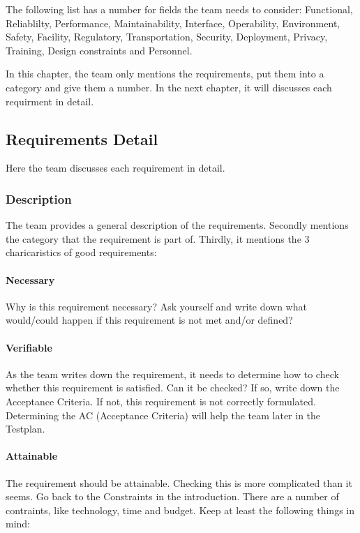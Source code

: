 \documentclass[10pt]{report}
\begin{document}
The following list has a number for fields the team needs to consider: Functional, Reliablilty, Performance, Maintainability, Interface, Operability, Environment, Safety, Facility, Regulatory, Transportation, Security, Deployment, Privacy, Training, Design constraints and Personnel.

In this chapter, the team only mentions the requirements, put them into a category and give them a number. In the next chapter, it will discusses each requirment in detail.

\subsection{Requirements Detail}

Here the team discusses each requirement in detail. 

\subsubsection{Description}

The team provides a general description of the requirements. Secondly mentions the category that the requirement is part of. Thirdly, it mentions the 3 charicaristics of good requirements:

\paragraph{Necessary}

Why is this requirement necessary? Ask yourself and write down what would/could happen if this requirement is not met and/or defined?

\paragraph{Verifiable}

As the team writes down the requirement, it needs to determine how to check whether this requirement is satisfied. Can it be checked? If so, write down the Acceptance Criteria. If not, this requirement is not correctly formulated. Determining the AC (Acceptance Criteria) will help the team later in the Testplan.

\paragraph{Attainable}

The requirement should be attainable. Checking this is more complicated than it seems. Go back to the Constraints in the introduction. There are a number of contraints, like technology, time and budget. Keep at least the following things in mind:
\end{document}
